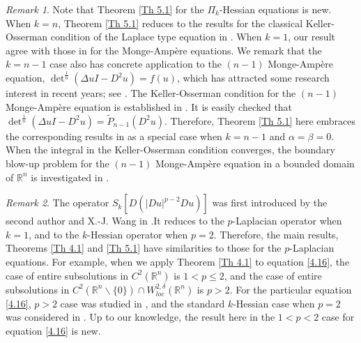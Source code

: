 \documentclass[a4paper,11pt]{amsart}
\theoremstyle{plain}
\theoremstyle{remark}
\newtheorem{remark}{Remark}
\numberwithin{equation}{section}
\numberwithin{figure}{section}
\numberwithin{remark}{section}
\begin{document}
\begin{sloppypar}
\begin{remark}\label{Re 6.2}
Note that Theorem \ref{Th 5.1} for the $\Pi_k$-Hessian equations is new. When $k=n$, Theorem \ref{Th 5.1} reduces to the results for the classical Keller-Osserman condition of the Laplace type equation in \cite{K1957, O1957}. When $k=1$, our result agree with those in \cite{JB2010} for the Monge-Amp\`ere equations. We remark that the $k=n-1$ case also has concrete application to the $(n-1)$ Monge-Amp\`ere equation, $\det^{\frac{1}{n}}(\Delta u I - D^2u)=f(u)$, which has attracted some research interest in recent years; see \cite{JL2021, TW2016}. The Keller-Osserman condition for the $(n-1)$ Monge-Amp\`ere equation is established in \cite{JJL2024}. It is easily checked that $\det^{\frac{1}{n}}(\Delta u I - D^2u)=\tilde P_{n-1}(D^2u)$. Therefore, Theorem \ref{Th 5.1} here embraces the corresponding results in \cite{JJL2024} as a special case when $k=n-1$ and $\alpha=\beta =0$. When the integral in the Keller-Osserman condition converges, the boundary blow-up problem for the  $(n-1)$ Monge-Amp\`ere equation in a bounded domain of $\mathbb{R}^n$ is investigated in \cite{JDJ2025}. 
\end{remark}

\begin{remark}\label{Re 6.3}
The operator $S_k [D(|Du|^{p-2}Du)]$ was first introduced by the second author and X.-J. Wang in \cite{TW1999}.It reduces to the $p$-Laplacian operator when $k=1$, and to the $k$-Hessian operator when $p=2$. Therefore, the main results, Theorems \ref{Th 4.1} and \ref{Th 5.1} have similarities to those for the $p$-Laplacian equations.
For example, when we apply Theorem \ref{Th 4.1} to equation \eqref{4.16}, the case of entire subsolutions in $C^2(\mathbb{R}^n)$ is $1<p\le 2$, and the case of entire subsolutions in $C^2(\mathbb{R}^n\backslash \{0\})\cap  W_{loc}^{2,\delta}(\mathbb{R}^n)$ is $p>2$. For the particular equation \eqref{4.16}, $p>2$ case was studied in \cite{BF2022}, and the standard $k$-Hessian case when $p=2$ was considered in \cite{JB2010}. Up to our knowledge, the result here in the $1<p<2$ case for equation \eqref{4.16} is new.
\end{remark}



\end{sloppypar}
\end{document}
